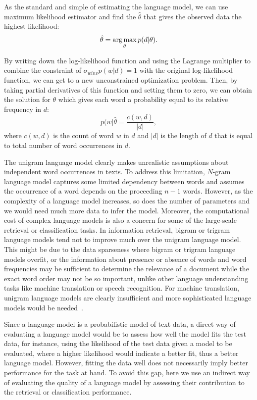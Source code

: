 As the standard and simple of estimating the language model, we can use maximum likelihood estimator and find the $\hat{\theta}$ that gives the observed data the highest likelihood:
\begin{equation}
\hat{\theta} = \operatorname*{arg\,max}_\theta p(d|\theta).
\end{equation}

By writing down the log-likelihood function and using the Lagrange multiplier to combine the constraint of $\sigma_{w in v}p(w|d) =1$ with the original log-likelihood function, we can get to a new unconstrained optimization problem. Then, by taking partial derivatives of this function and setting them to zero, we can obtain the solution for $\theta$ which gives each word a probability equal to its relative frequency in $d$:
\begin{equation}
    p(w|\hat{\theta} = \frac{c(w, d)}{|d|},
\end{equation}
where $c(w, d)$ is the count of word $w$ in $d$ and $|d|$ is the length of $d$ that is equal to total number of word occurrences in $d$.

The unigram language model clearly makes unrealistic assumptions about independent word occurrences in texts. To address this limitation, $N$-gram language model captures some limited dependency between words and assumes the occurrence of a word depends on the proceeding $n-1$ words.  However, as the complexity of a language model increases, so does the number of parameters and we would need much more data to infer the model. Moreover, the computational cost of complex language models is also a concern for some of the large-scale retrieval or classification tasks. 
%
In information retrieval, bigram or trigram language models tend not to improve much over the unigram language model. This might be due to the data sparseness where bigram or trigram language models overfit, or the information about presence or absence of words and word frequencies may be sufficient to determine the relevance of a document while the exact word order may not be so important, unlike other language understanding tasks like machine translation or speech recognition. For machine translation, unigram language models are clearly insufficient and more sophisticated language models would be needed~\citep{zhai2008statistical}. 

Since a language model is a probabilistic model of text data, a direct way of evaluating a language model would be to assess how well the model fits the test data, for instance, using the likelihood of the test data given a model to be evaluated, where a higher likelihood would indicate a better fit, thus a better language model.
However, fitting the data well does not necessarily imply better performance for the task at hand. To avoid this gap, here we use an indirect way of evaluating the quality of a language model by assessing their contribution to the retrieval or classification performance.

